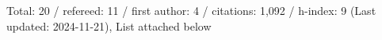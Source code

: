 Total: 20 / refereed: 11 / first author: 4 / citations: 1,092 / h-index: 9 (Last updated: 2024-11-21), List attached below